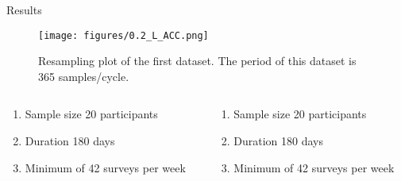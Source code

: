 \documentclass{beamer}
\begin{document}
    \begin{frame}{Results}
        \begin{figure}[H]
            \centering
            \begin{minipage}[b]{1\textwidth}
                \texttt{[image: figures/0.2\_L\_ACC.png]}
            \end{minipage}
            \caption{Resampling plot of the first dataset. The period of this dataset is 365 samples/cycle. }
            \label{fig:Ass1_D1_resample}
        \end{figure}
        \begin{columns}
            \begin{column}{0.5\textwidth}
                \begin{enumerate}
                    \item Sample size 20 participants
                    \item Duration 180 days
                    \item Minimum of 42 surveys per week
                \end{enumerate}
            \end{column}
            \begin{column}{0.5\textwidth}
                \begin{enumerate}
                    \item Sample size 20 participants
                    \item Duration 180 days
                    \item Minimum of 42 surveys per week
                \end{enumerate}
            \end{column}
        \end{columns}
    \end{frame}
    
    
    
    
\end{document}
